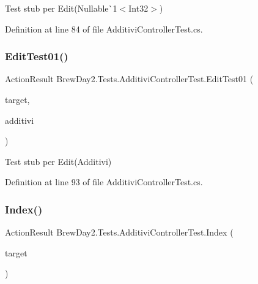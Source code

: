 Test stub per Edit(Nullable\`{}1$<$Int32$>$)



Definition at line 84 of file Additivi\+Controller\+Test.\+cs.

\mbox{\label{class_brew_day2_1_1_tests_1_1_additivi_controller_test_a54ded1817d33bfb67309ae0ebeb9122f}} 
\subsubsection{\texorpdfstring{Edit\+Test01()}{EditTest01()}}
{\footnotesize\ttfamily Action\+Result Brew\+Day2.\+Tests.\+Additivi\+Controller\+Test.\+Edit\+Test01 (\begin{DoxyParamCaption}\item[{\mbox{[}\+Pex\+Assume\+Under\+Test\mbox{]} \mbox{\hyperlink{class_brew_day2_1_1_controllers_1_1_additivi_controller}{Additivi\+Controller}}}]{target,  }\item[{\mbox{\hyperlink{class_brew_day2_1_1_models_1_1_additivi}{Additivi}}}]{additivi }\end{DoxyParamCaption})}



Test stub per Edit(\+Additivi)



Definition at line 93 of file Additivi\+Controller\+Test.\+cs.

\mbox{\label{class_brew_day2_1_1_tests_1_1_additivi_controller_test_a58526dd197cdb5d5113c2a84b6687075}} 
\subsubsection{\texorpdfstring{Index()}{Index()}}
{\footnotesize\ttfamily Action\+Result Brew\+Day2.\+Tests.\+Additivi\+Controller\+Test.\+Index (\begin{DoxyParamCaption}\item[{\mbox{[}\+Pex\+Assume\+Under\+Test\mbox{]} \mbox{\hyperlink{class_brew_day2_1_1_controllers_1_1_additivi_controller}{Additivi\+Controller}}}]{target }\end{DoxyParamCaption})}



